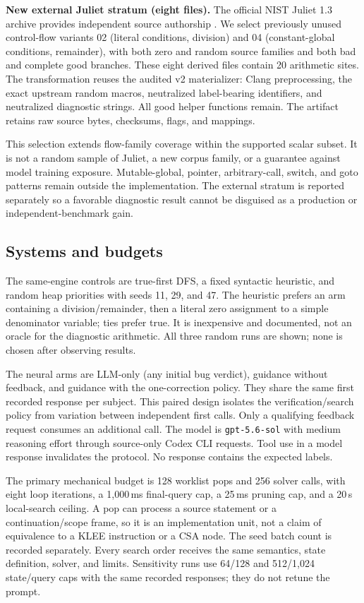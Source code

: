 \documentclass[sigconf]{acmart}
\begin{document}
\textbf{New external Juliet stratum (eight files).} The official NIST
Juliet 1.3 archive provides independent source authorship \cite{juliet}.
We select previously unused control-flow variants 02 (literal
conditions, division) and 04 (constant-global conditions, remainder),
with both zero and random source families and both bad and complete good
branches. These eight derived files contain 20 arithmetic sites.
The transformation reuses the audited v2 materializer: Clang preprocessing,
the exact upstream random macros, neutralized label-bearing identifiers,
and neutralized diagnostic strings. All good helper functions remain.
The artifact retains raw source bytes, checksums, flags, and mappings.

This selection extends flow-family coverage within the supported scalar
subset. It is not a random sample of Juliet, a new corpus family, or a
guarantee against model training exposure. Mutable-global, pointer,
arbitrary-call, switch, and goto patterns remain outside the implementation.
The external stratum is reported separately so a favorable diagnostic
result cannot be disguised as a production or independent-benchmark gain.

\subsection{Systems and budgets}
The same-engine controls are true-first DFS, a fixed syntactic heuristic,
and random heap priorities with seeds 11, 29, and 47. The heuristic prefers
an arm containing a division/remainder, then a literal zero assignment to
a simple denominator variable; ties prefer true. It is inexpensive and
documented, not an oracle for the diagnostic arithmetic. All three random
runs are shown; none is chosen after observing results.

The neural arms are LLM-only (any initial bug verdict), guidance without
feedback, and guidance with the one-correction policy. They share the same
first recorded response per subject. This paired design isolates the
verification/search policy from variation between independent first calls.
Only a qualifying feedback request consumes an additional call.
The model is \texttt{gpt-5.6-sol} with medium reasoning effort through
source-only Codex CLI requests. Tool use in a model response invalidates
the protocol. No response contains the expected labels.

The primary mechanical budget is 128 worklist pops and 256 solver calls,
with eight loop iterations, a 1,000\,ms final-query cap, a 25\,ms pruning
cap, and a 20\,s local-search ceiling. A pop can process a source statement
or a continuation/scope frame, so it is an implementation unit, not a
claim of equivalence to a KLEE instruction or a CSA node. The seed batch
count is recorded separately. Every search order receives the same
semantics, state definition, solver, and limits. Sensitivity runs use
64/128 and 512/1,024 state/query caps with the same recorded responses;
they do not retune the prompt.
\end{document}
